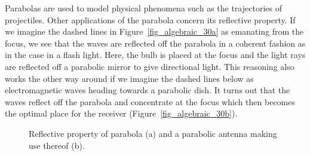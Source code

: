 \ifcourse
Parabolas are used to model physical phenomena such as the trajectories of projectiles.  Other applications of the parabola concern its reflective property. If we imagine the dashed lines in Figure~\ref{fig_algebraic_30a} as emanating from the focus, we see that the waves are reflected off the parabola in a coherent fashion as in the case in a flash light.  Here, the bulb is placed at the focus and the light rays are reflected off a parabolic mirror to give directional light. This reasoning also works the other way around if we imagine the dashed lines below as electromagnetic waves heading towards a parabolic dish.  It turns out that the waves reflect off the parabola and concentrate at the focus which then becomes the optimal place for the receiver (Figure~\ref{fig_algebraic_30b}). 



\begin{figure}[H]
\centering
\centerline{
\hspace{2cm}
}

\caption{Reflective property of parabola (a) and a parabolic antenna making use thereof (b).}
\end{figure}



